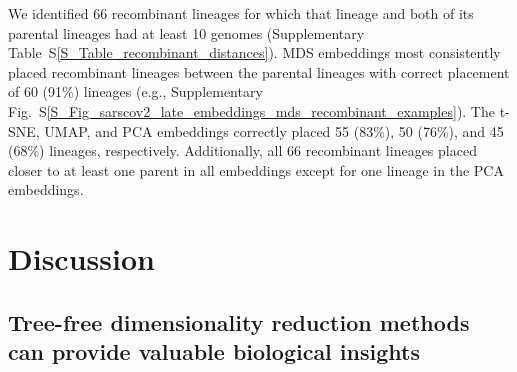 \documentclass[webpdf,contemporary,large,single]{oup-authoring-template}%
\theoremstyle{thmstyleone}%
\theoremstyle{thmstyletwo}%
\theoremstyle{thmstylethree}%
\begin{document}
We identified 66 recombinant lineages for which that lineage and both of its parental lineages had at least 10 genomes (Supplementary Table~S\ref{S_Table_recombinant_distances}).
MDS embeddings most consistently placed recombinant lineages between the parental lineages with correct placement of 60 (91\%) lineages (e.g., Supplementary Fig.~S\ref{S_Fig_sarscov2_late_embeddings_mds_recombinant_examples}).
The t-SNE, UMAP, and PCA embeddings correctly placed 55 (83\%), 50 (76\%), and 45 (68\%) lineages, respectively.
Additionally, all 66 recombinant lineages placed closer to at least one parent in all embeddings except for one lineage in the PCA embeddings.

\section{Discussion}

\subsection{Tree-free dimensionality reduction methods can provide valuable biological insights}
\end{document}
